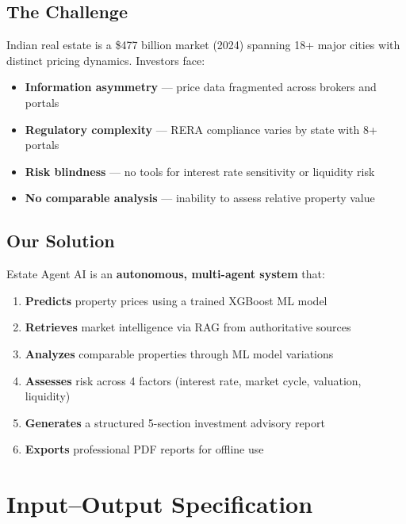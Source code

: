 \documentclass[12pt,a4paper]{article}
\begin{document}
\subsection{The Challenge}
Indian real estate is a \$477 billion market (2024) spanning 18+ major cities with distinct pricing dynamics. Investors face:
\begin{itemize}[noitemsep]
    \item \textbf{Information asymmetry} — price data fragmented across brokers and portals
    \item \textbf{Regulatory complexity} — RERA compliance varies by state with 8+ portals
    \item \textbf{Risk blindness} — no tools for interest rate sensitivity or liquidity risk
    \item \textbf{No comparable analysis} — inability to assess relative property value
\end{itemize}

\subsection{Our Solution}
Estate Agent AI is an \textbf{autonomous, multi-agent system} that:
\begin{enumerate}[noitemsep]
    \item \textbf{Predicts} property prices using a trained XGBoost ML model
    \item \textbf{Retrieves} market intelligence via RAG from authoritative sources
    \item \textbf{Analyzes} comparable properties through ML model variations
    \item \textbf{Assesses} risk across 4 factors (interest rate, market cycle, valuation, liquidity)
    \item \textbf{Generates} a structured 5-section investment advisory report
    \item \textbf{Exports} professional PDF reports for offline use
\end{enumerate}

\section{Input--Output Specification}
\end{document}
